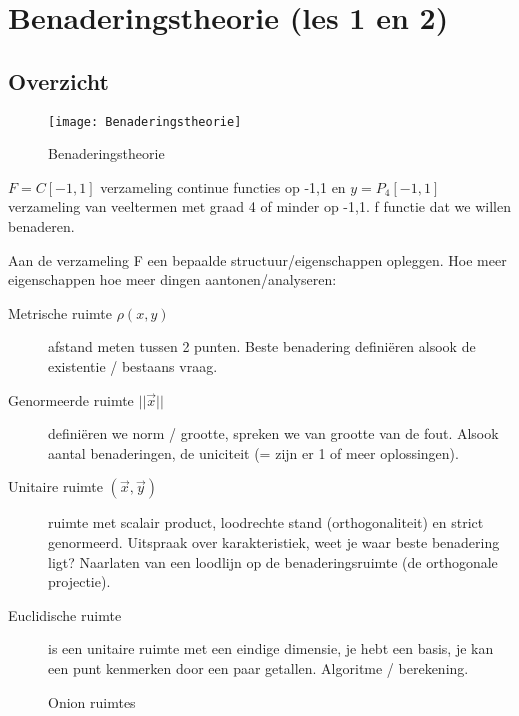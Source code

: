 \chapter{Benaderingstheorie (les 1 en 2)}
\section{Overzicht}
\begin{figure}[h]
	\centering
	\texttt{[image: Benaderingstheorie]}
	\caption{Benaderingstheorie}
\end{figure}
$ F = C[-1,1] $ verzameling continue functies op -1,1 en $ y = P_4[-1,1]$ verzameling van veeltermen met graad 4 of minder op -1,1. f functie dat we willen benaderen.

\begin{exam}   

Aan de verzameling F een bepaalde structuur/eigenschappen opleggen. Hoe meer eigenschappen hoe meer dingen aantonen/analyseren:
\begin{description}
\item[Metrische ruimte $\rho(x,y)$] afstand meten tussen 2 punten. Beste benadering defini\"eren alsook de existentie / bestaans vraag.
\item[Genormeerde ruimte $||\vec{x}||$] defini\"eren we norm / grootte, spreken we van grootte van de fout. Alsook aantal benaderingen, de uniciteit (= zijn er 1 of meer oplossingen). 
\item[Unitaire ruimte $( \vec{x},\vec{y} ) $] ruimte met scalair product, loodrechte stand (orthogonaliteit) en strict genormeerd. Uitspraak over karakteristiek, weet je waar beste benadering ligt? Naarlaten van een loodlijn op de benaderingsruimte (de orthogonale projectie).
\item[Euclidische ruimte] is een unitaire ruimte met een eindige dimensie, je hebt een basis, je kan een punt kenmerken door een paar getallen. Algoritme / berekening.
\end{description}
\end{exam}

 \begin{figure}[h]
 \centering
{}
  \caption{Onion ruimtes}
  \end{figure}


